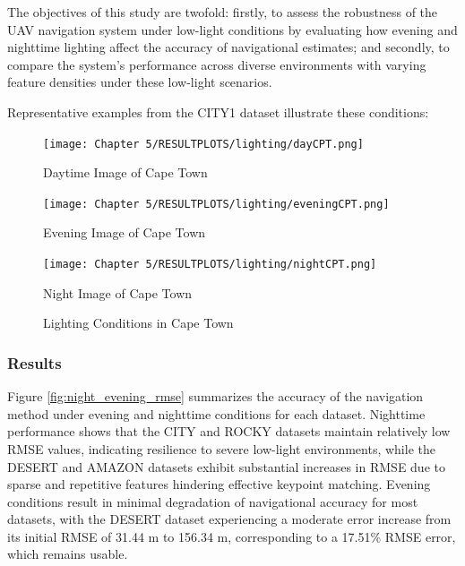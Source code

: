 The objectives of this study are twofold: firstly, to assess the robustness of the UAV navigation system under low-light conditions by evaluating how evening and nighttime lighting affect the accuracy of navigational estimates; and secondly, to compare the system's performance across diverse environments with varying feature densities under these low-light scenarios.

Representative examples from the CITY1 dataset illustrate these conditions:

\begin{figure}[H]
    \centering
    \begin{minipage}{0.32\textwidth} %
        \centering
        \texttt{[image: Chapter 5/RESULTPLOTS/lighting/dayCPT.png]}
        \caption{Daytime Image of Cape Town}
        \label{fig:Day_CPT}
    \end{minipage}\hfill
    \begin{minipage}{0.32\textwidth} %
        \centering
        \texttt{[image: Chapter 5/RESULTPLOTS/lighting/eveningCPT.png]}
        \caption{Evening Image of Cape Town}
        \label{fig:Evening_CPT}
    \end{minipage}\hfill
    \begin{minipage}{0.32\textwidth} %
        \centering
        \texttt{[image: Chapter 5/RESULTPLOTS/lighting/nightCPT.png]}
        \caption{Night Image of Cape Town}
        \label{fig:Night_CPT}
    \end{minipage}
    
    \caption{Lighting Conditions in Cape Town}
    \label{fig:Lighting_CPT}
\end{figure}


\subsubsection{Results}

Figure \ref{fig:night_evening_rmse} summarizes the accuracy of the navigation method under evening and nighttime conditions for each dataset. Nighttime performance shows that the CITY and ROCKY datasets maintain relatively low RMSE values, indicating resilience to severe low-light environments, while the DESERT and AMAZON datasets exhibit substantial increases in RMSE due to sparse and repetitive features hindering effective keypoint matching. Evening conditions result in minimal degradation of navigational accuracy for most datasets, with the DESERT dataset experiencing a moderate error increase from its initial RMSE of 31.44 m to 156.34 m, corresponding to a 17.51\% RMSE error, which remains usable. 

